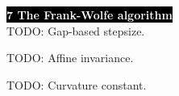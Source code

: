 \documentclass{article}
\newenvironment{topic}[1]
{\textbf{\sffamily \colorbox{black}{\textcolor{white}{#1}}} \\ \vspace{0.2cm}}
{}
\begin{document}
\begin{multicols*}{3}
\begin{topic}{7 The Frank-Wolfe algorithm}
        TODO: Gap-based stepsize.

        TODO: Affine invariance.

        TODO: Curvature constant.

    \end{topic}

\end{multicols*}
\end{document}
